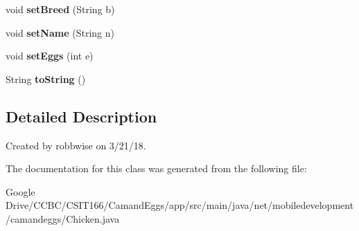 \begin{DoxyCompactItemize}
void {\bfseries set\+Breed} (String b)
\item 
\mbox{\label{classnet_1_1mobiledevelopment_1_1camandeggs_1_1_chicken_a32d105215a6663638466b6686c46d846}} 
void {\bfseries set\+Name} (String n)
\item 
\mbox{\label{classnet_1_1mobiledevelopment_1_1camandeggs_1_1_chicken_ab670c03a86488a38865c8fcd6d291196}} 
void {\bfseries set\+Eggs} (int e)
\item 
\mbox{\label{classnet_1_1mobiledevelopment_1_1camandeggs_1_1_chicken_ab62786f60d359a4a3f045aa28e1f0c4d}} 
String {\bfseries to\+String} ()
\end{DoxyCompactItemize}


\subsection{Detailed Description}
Created by robbwise on 3/21/18. 

The documentation for this class was generated from the following file\+:\begin{DoxyCompactItemize}
\item 
Google Drive/\+C\+C\+B\+C/\+C\+S\+I\+T166/\+Camand\+Eggs/app/src/main/java/net/mobiledevelopment/camandeggs/Chicken.\+java\end{DoxyCompactItemize}
